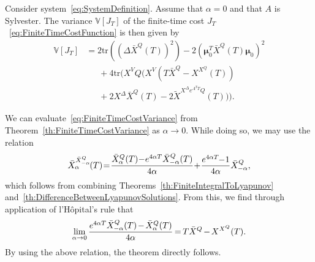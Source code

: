 \documentclass[twocolumn]{autart}
\newcommand{\ve}[1]{{\boldsymbol{#1}}} \newcommand{\tr}{\mbox{tr}} \newcommand{\ex}{\mathds{E}} \newcommand{\va}{\mathds{V}}
\begin{document}
\begin{thm}\label{th:FiniteTimeCostVarianceWithAlphaZero}
Consider system~\eqref{eq:SystemDefinition}. Assume that $\alpha = 0$ and that $A$ is Sylvester. The variance $\va[J_T]$ of the finite-time cost $J_T$~\eqref{eq:FiniteTimeCostFunction} is then given by
\begin{align}
\va[J_T] & = 2\tr\left((\Delta \bar{X}^Q(T))^2\right) - 2\left(\ve{\mu}_0^T \bar{X}^Q(T) \ve{\mu}_0\right)^2 \nonumber \\
& \hspace{18pt} + 4\tr\bigg(X^V Q \bigg(X^V \left(T\bar{X}^Q - X^{X^Q}(T)\right) \nonumber \\
& \hspace{18pt} + 2X^\Delta \bar{X}^Q(T) - 2\tilde{X}^{X^\Delta e^{A^T T} Q}(T)\bigg)\bigg). \label{eq:FiniteTimeCostVarianceWithAlphaZero}
\end{align}
\end{thm}
\begin{pf}
We can evaluate~\eqref{eq:FiniteTimeCostVariance} from Theorem~\ref{th:FiniteTimeCostVariance} as $\alpha \rightarrow 0$. While doing so, we may use the relation
\begin{equation}
\bar{X}_\alpha^{\bar{X}_{-\alpha}^Q}\hspace{-1pt}(T) \hspace{-2pt}=\hspace{-2pt} \frac{\bar{X}_\alpha^Q(T) \hspace{-2pt}-\hspace{-2pt} e^{4\alpha T} \bar{X}_{-\alpha}^Q(T)}{4\alpha} \hspace{-2pt}+\hspace{-2pt} \frac{e^{4\alpha T} \hspace{-3pt}-\hspace{-2pt} 1}{4\alpha} \bar{X}_{-\alpha}^Q,
\end{equation}
which follows from combining Theorems~\ref{th:FiniteIntegralToLyapunov} and~\ref{th:DifferenceBetweenLyapunovSolutions}. From this, we find through application of l'H\^opital's rule that
\begin{equation}
\lim_{\alpha \rightarrow 0} \frac{e^{4\alpha T} \bar{X}_{-\alpha}^Q(T) \hspace{-1pt}-\hspace{-1pt} \bar{X}_\alpha^Q(T)}{4\alpha} \hspace{-1pt}=\hspace{-1pt} T\bar{X}^Q \hspace{-1pt}-\hspace{-1pt} X^{X^Q}(T).
\end{equation}
By using the above relation, the theorem directly follows.
\end{pf}
\end{document}
